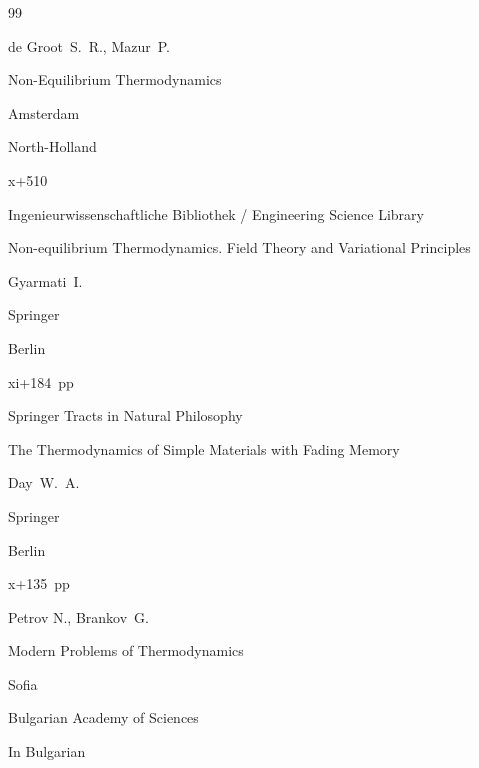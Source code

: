 \begin{thebibliography}{99}




\by de Groot~S.~R., Mazur~P. 

\book Non-Equilibrium Thermodynamics

\publaddr Amsterdam

\publ North-Holland


\totalpages x+510




\serial  Ingenieurwissenschaftliche Bibliothek / Engineering Science Library


\book Non-equilibrium Thermodynamics. Field Theory and Variational Principles

\by Gyarmati~I.


\publ Springer 

\publaddr Berlin

\totalpages xi+184~pp \nofrills






\serial  Springer Tracts in Natural Philosophy


\book The Thermodynamics of Simple Materials with Fading Memory

\by Day~W.~A.

\publ Springer 

\publaddr Berlin


\totalpages x+135~pp \nofrills





\by Petrov N., Brankov~G.


\book Modern Problems of Thermodynamics

\publaddr Sofia

\publ Bulgarian Academy of Sciences

\lang In Bulgarian




\end{thebibliography}
